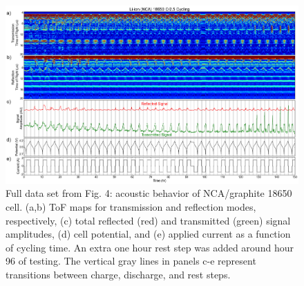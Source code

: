 \begin{figure}[htb]
  \centering
    \includegraphics[width=\textwidth]{ch-appendices/images/ncafull.png}
    \caption[Full data set from Fig. 4: acoustic behavior of NCA/graphite 18650 cell.]{Full data set from Fig. 4: acoustic behavior of NCA/graphite 18650 cell. (a,b) ToF maps for transmission and reflection modes, respectively, (c) total reflected (red) and transmitted (green) signal amplitudes, (d) cell potential, and (e) applied current as a function of cycling time. An extra one hour rest step was added around hour 96 of testing. The vertical gray lines in panels c-e represent transitions between charge, discharge, and rest steps.}
    \label{fig:ncafull}
\end{figure}  